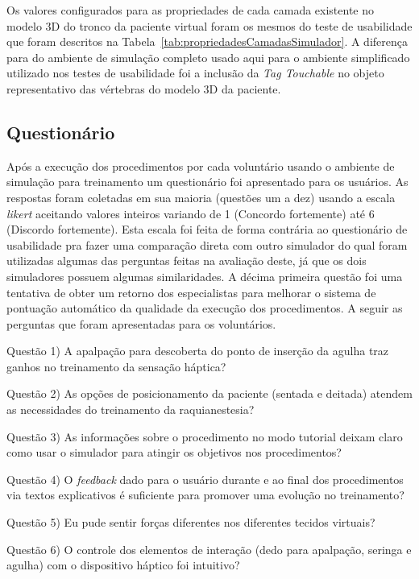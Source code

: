 Os valores configurados para as propriedades de cada camada existente no modelo 3D do tronco da paciente virtual foram os mesmos do teste de usabilidade que foram descritos na Tabela~\ref{tab:propriedadesCamadasSimulador}. A diferença para do ambiente de simulação completo usado aqui para o ambiente simplificado utilizado nos testes de usabilidade foi a inclusão da \textit{Tag Touchable} no objeto representativo das vértebras do modelo 3D da paciente. 

\subsection{Questionário}
\label{sec:questionarioEspecialistas}

Após a execução dos procedimentos por cada voluntário usando o ambiente de simulação para treinamento um questionário foi apresentado para os usuários. As respostas foram coletadas em sua maioria (questões um a dez) usando a escala \textit{likert} \cite{Norman2010} aceitando valores inteiros variando de 1 (Concordo fortemente) até 6 (Discordo fortemente). Esta escala foi feita de forma contrária ao questionário de usabilidade pra fazer uma comparação direta com outro simulador \cite{Farber2008} do qual foram utilizadas algumas das perguntas feitas na avaliação deste, já que os dois simuladores possuem algumas similaridades. A décima primeira questão foi uma tentativa de obter um retorno dos especialistas para melhorar o sistema de pontuação automático da qualidade da execução dos procedimentos. A seguir as perguntas que foram apresentadas para os voluntários.

Questão 1) A apalpação para descoberta do ponto de inserção da agulha traz ganhos no treinamento da sensação háptica?

Questão 2) As opções de posicionamento da paciente (sentada e deitada) atendem as necessidades do treinamento da raquianestesia?

Questão 3) As informações sobre o procedimento no modo tutorial deixam claro como usar o simulador para atingir os objetivos nos procedimentos?

Questão 4) O \textit{feedback} dado para o usuário durante e ao final dos procedimentos via textos explicativos é suficiente para promover uma evolução no treinamento?

Questão 5) Eu pude sentir forças diferentes nos diferentes tecidos virtuais?

Questão 6) O controle dos elementos de interação (dedo para apalpação, seringa e agulha) com o dispositivo háptico foi intuitivo?

